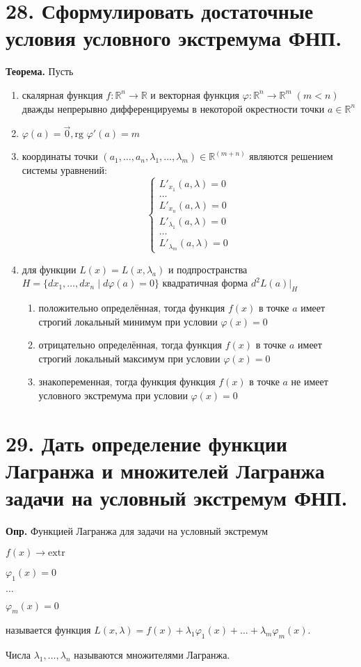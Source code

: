 \documentclass[11pt]{article}
\begin{document}
\section*{28. Сформулировать достаточные условия условного экстремума ФНП.}
\par\textbf{Теорема.} Пусть
\begin{enumerate}
    \item скалярная функция $f: \mathbb{R}^{n} \to \mathbb{R}$ и векторная функция $\varphi: \mathbb{R}^{n} \to \mathbb{R}^m \; (m < n)$ дважды непрерывно дифференцируемы в некоторой окрестности точки $a \in \mathbb{R}^n$
    \item $\varphi(a) = \vec{0}, \text{rg } \varphi'(a) = m$
    \item координаты точки $(a_{1}, \dots, a_{n}, \lambda_{1}, \dots, \lambda_{m}) \in \mathbb{R}^{(m + n)}$ являются решением системы уравнений:
$$\left\{\begin{array}{l}
L'_{x_{1}} (a, \lambda) = 0 \\
\dots \\
L'_{x_{n}} (a, \lambda) = 0 \\
L'_{\lambda_{1}} (a, \lambda) = 0 \\
\dots \\
L'_{\lambda_{m}} (a, \lambda) = 0
\end{array}\right.$$
\item для функции $L(x) = L(x, \lambda_{a})$ и подпространства $H = \{ dx_{1}, \dots, dx_{n} \; | \; d\varphi(a) = 0 \}$ квадратичная форма $d^2L(a)|_{H}$
    \begin{enumerate}
        \item положительно определённая, тогда функция $f(x)$ в точке $a$ имеет строгий локальный минимум при условии $\varphi(x) = 0$
        \item отрицательно определённая, тогда функция $f(x)$ в точке $a$ имеет строгий локальный максимум при условии $\varphi(x) = 0$
        \item знакопеременная, тогда функция функция $f(x)$ в точке $a$ не имеет условного экстремума при условии $\varphi(x) = 0$
    \end{enumerate}
\end{enumerate}

\section*{29. Дать определение функции Лагранжа и множителей Лагранжа задачи на условный экстремум ФНП.}
\par\textbf{Опр.} Функцией Лагранжа для задачи на условный экстремум
\par $f(x) \to \text{extr}$
\par $\varphi_{1}(x) = 0$
\par $\dots$ 
\par $\varphi_{m}(x) = 0$
\par называется функция $L(x, \lambda) = f(x) + \lambda_{1}\varphi_{1}(x) + \dots + \lambda_{m}\varphi_{m}(x)$.
\par Числа $\lambda_{1}, \dots, \lambda_{n}$ называются множителями Лагранжа.
\end{document}
